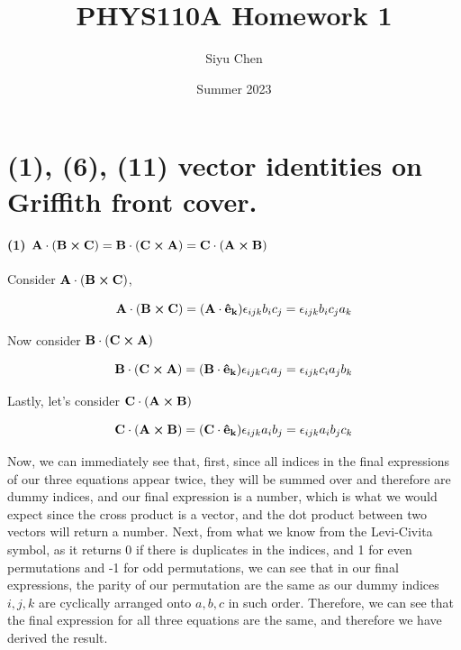 \documentclass{article}
\title{PHYS110A Homework 1}
\author{Siyu Chen}
\date{Summer 2023}
\numberwithin{equation}{section}
\begin{document}
\maketitle

\section{(1), (6), (11) vector identities on Griffith front cover.}

\paragraph{(1) $\vb{A \cdot (B \cross C) = B \cdot (C \cross A) = C \cdot (A \cross B)} \\$}

Consider $\vb{A \cdot (B \cross C)}$,

\begin{equation}
    \vb{A \cdot (B \cross C) = (A \cdot \hat{e}_k)} \epsilon_{ijk} b_i c_j = \epsilon_{ijk} b_i c_j a_k
\end{equation}

Now consider $\vb{B \cdot (C \cross A)}$

\begin{equation}
    \vb{B \cdot (C \cross A) = (B \cdot \hat{e}_k)} \epsilon_{ijk} c_i a_j = \epsilon_{ijk} c_i a_j b_k
\end{equation}

Lastly, let's consider $\vb{C \cdot (A \cross B)}$

\begin{equation}
    \vb{C \cdot (A \cross B) = (C \cdot \hat{e}_k)} \epsilon_{ijk} a_i b_j = \epsilon_{ijk} a_i b_j c_k
\end{equation}

Now, we can immediately see that, first, since all indices in the final expressions of our three equations appear twice, they will be summed over and therefore are dummy indices, and our final expression is a number, which is what we would expect since the cross product is a vector, and the dot product between two vectors will return a number. Next, from what we know from the Levi-Civita symbol, as it returns 0 if there is duplicates in the indices, and 1 for even permutations and -1 for odd permutations, we can see that in our final expressions, the parity of our permutation are the same as our dummy indices $i,j,k$ are cyclically arranged onto $a,b,c$ in such order. Therefore, we can see that the final expression for all three equations are the same, and therefore we have derived the result.
\end{document}
